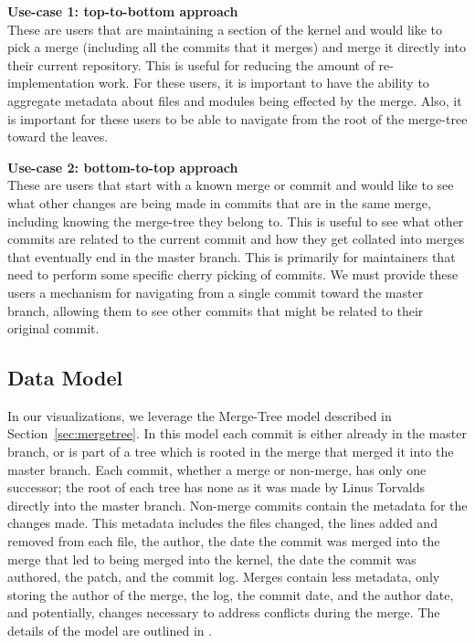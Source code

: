 \documentclass[conference, draftclsnofoot, draft]{IEEEtran}
\begin{document}
\noindent \textbf{Use-case 1: top-to-bottom approach}\label{sec:usecase1}\\ These
are users that are maintaining a section of the kernel and would like to pick a
merge (including all the commits that it merges) and merge it directly into their
current repository. This is useful for reducing the amount of re-implementation
work. For these users, it is important to have the ability to aggregate metadata
about files and modules being effected by the merge. Also, it is important for these
users to be able to navigate from the root of the merge-tree toward the leaves.

\noindent \textbf{Use-case 2: bottom-to-top approach}\label{sec:usecase2}\\
These are users that start with a known merge or commit and would like to see what
other changes are being made in commits that are in the same merge, including
knowing the merge-tree they belong to. This is useful to see what other commits are
related to the current commit and how they get collated into merges that eventually
end in the master branch. This is primarily for maintainers that need to perform
some specific cherry picking of commits. We must provide these users a mechanism for
navigating from a single commit toward the master branch, allowing them to see other
commits that might be related to their original commit.

\subsection{Data Model}

In our visualizations, we leverage the Merge-Tree model described in
Section~\ref{sec:mergetree}. In this model each commit is either already in the
master branch, or is part of a tree which is rooted in the merge that merged it into
the master branch.  Each commit, whether a merge or non-merge, has only one
successor; the root of each tree has none as it was made by Linus Torvalds directly
into the master branch. Non-merge commits contain the metadata for the changes made.
This metadata includes the files changed, the lines added and removed from each
file, the author, the date the commit was merged into the merge that led to being
merged into the kernel, the date the commit was authored, the patch, and the commit
log. Merges contain less metadata, only storing the author of the merge, the log,
the commit date, and the author date, and potentially, changes necessary to address
conflicts during the merge. The details of the model are outlined in
\cite{German2015}.
\end{document}
